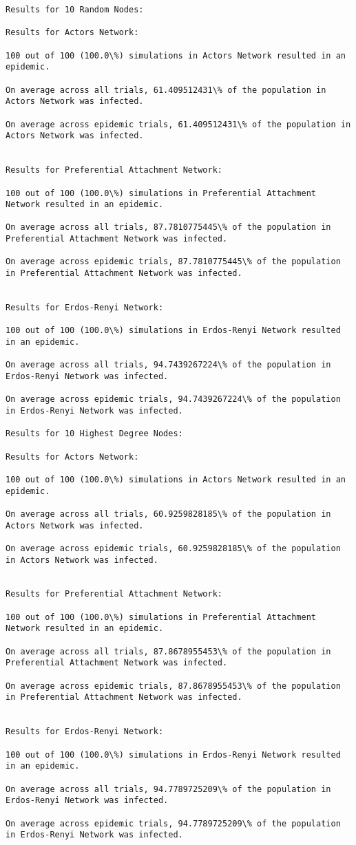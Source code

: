 \documentclass[11pt]{article}
\begin{document}
    \begin{Verbatim}[commandchars=\\\{\}]
Results for 10 Random Nodes:

Results for Actors Network:

100 out of 100 (100.0\%) simulations in Actors Network resulted in an epidemic.

On average across all trials, 61.409512431\% of the population in Actors Network was infected.

On average across epidemic trials, 61.409512431\% of the population in Actors Network was infected.


Results for Preferential Attachment Network:

100 out of 100 (100.0\%) simulations in Preferential Attachment Network resulted in an epidemic.

On average across all trials, 87.7810775445\% of the population in Preferential Attachment Network was infected.

On average across epidemic trials, 87.7810775445\% of the population in Preferential Attachment Network was infected.


Results for Erdos-Renyi Network:

100 out of 100 (100.0\%) simulations in Erdos-Renyi Network resulted in an epidemic.

On average across all trials, 94.7439267224\% of the population in Erdos-Renyi Network was infected.

On average across epidemic trials, 94.7439267224\% of the population in Erdos-Renyi Network was infected.

Results for 10 Highest Degree Nodes:

Results for Actors Network:

100 out of 100 (100.0\%) simulations in Actors Network resulted in an epidemic.

On average across all trials, 60.9259828185\% of the population in Actors Network was infected.

On average across epidemic trials, 60.9259828185\% of the population in Actors Network was infected.


Results for Preferential Attachment Network:

100 out of 100 (100.0\%) simulations in Preferential Attachment Network resulted in an epidemic.

On average across all trials, 87.8678955453\% of the population in Preferential Attachment Network was infected.

On average across epidemic trials, 87.8678955453\% of the population in Preferential Attachment Network was infected.


Results for Erdos-Renyi Network:

100 out of 100 (100.0\%) simulations in Erdos-Renyi Network resulted in an epidemic.

On average across all trials, 94.7789725209\% of the population in Erdos-Renyi Network was infected.

On average across epidemic trials, 94.7789725209\% of the population in Erdos-Renyi Network was infected.


    \end{Verbatim}


    
    
    
    
\end{document}
